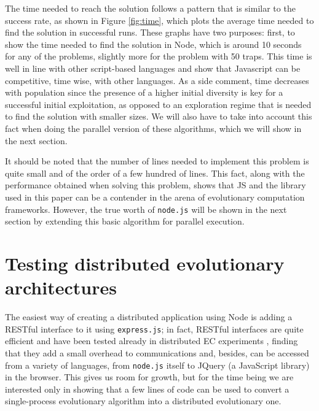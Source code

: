 \documentclass{sig-alternate}
\begin{document}
The time needed to reach the solution follows a pattern that is
similar to the success rate, as shown in Figure \ref{fig:time}, which
plots the average time needed to find the solution in successful
runs. These graphs have two purposes: first, to show the time needed to
find the solution in Node, which is around 10 seconds for any of the
problems, slightly more for the problem with 50 traps. This time is
well in line with other script-based languages and show that
Javascript can be competitive, time wise, with other languages. As a
side comment, time decreases with population since the presence of a
higher initial diversity is key for a successful initial exploitation,
as opposed to an exploration regime that is needed to find the solution
with smaller sizes. We will also have to take into account this fact
when doing the parallel version of these algorithms, which we will
show in the next section.

It should be noted that the number of lines needed to implement this
problem is quite small and of the order of a few hundred of
lines. This fact, along with the performance obtained when solving
this problem, shows that JS and the library used in this paper
can be a contender in the arena of evolutionary computation
frameworks. 
However, the true worth of {\tt node.js} will be shown in the
next section by extending this basic algorithm for parallel execution.

\section{Testing distributed evolutionary architectures}
\label{sec:dist}


The easiest way of creating a distributed application using Node is
adding a RESTful interface to it using {\tt express.js}; in fact,
RESTful interfaces are quite efficient and have been tested already in
distributed EC experiments \cite{DBLP:journals/corr/abs-1105-4978},
finding that they add a small overhead to communications and, besides,
can be accessed from a variety of languages, from {\tt node.js} itself to
JQuery (a JavaScript library) in the browser. This gives us room for
growth, but for the time being we are interested only in showing that
a few lines of code can be used to convert a single-process
evolutionary algorithm into a distributed evolutionary one.
\end{document}
